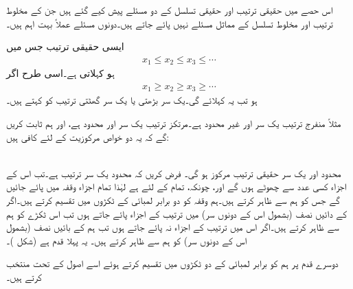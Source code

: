 اس حصے میں حقیقی ترتیب اور حقیقی تسلسل کے دو مسئلے پیش کیے گئے ہیں جن کے مخلوط ترتیب اور مخلوط تسلسل کے مماثل مسئلے نہیں پائے جاتے ہیں۔دونوں مسئلے عملاً بہت اہم ہیں۔

ایسی حقیقی ترتیب   جس میں
\begin{align*}
x_1\le x_2\le x_3\le\cdots
\end{align*} 
ہو  کہلاتی ہے۔اسی طرح  اگر
\begin{align*}
x_1\ge x_2\ge x_3\ge\cdots
\end{align*} 
ہو تب یہ  کہلائے گی۔یک سر بڑھتی یا یک سر گھٹتی ترتیب
 کو   کہتے ہیں۔

مثلاً منفرج ترتیب  یک سر اور غیر محدود ہے۔مرتکز ترتیب  یک سر اور محدود ہے، اور ہم ثابت کریں گے کہ یہ دو خواص مرکوزیت کے لئے کافی ہیں:

\quad {}\\
محدود اور یک سر حقیقی ترتیب مرکوز ہو گی۔
\quad
فرض کریں کہ  محدود یک سر ترتیب ہے۔تب اس کے اجزاء کسی عدد  سے چھوٹے ہوں گے اور، چونکہ، تمام  کے لئے  ہے لہٰذا تمام اجزاء  وقفہ  میں پائے جائیں گے جس کو ہم  سے ظاہر کرتے ہیں۔ہم  وقفہ  کو دو برابر لمبائی کے ٹکڑوں میں تقسیم کرتے ہیں۔اگر  کے دائیں نصف (بشمول اس کے دونوں سر) میں ترتیب کے اجزاء پائے جاتے ہوں تب اس ٹکڑے کو ہم  سے ظاہر کرتے ہیں۔اگر اس میں ترتیب کے اجزاء نہ پائے جاتے ہوں تب ہم  کے بائیں نصف (بشمول اس کے دونوں سر) کو ہم  سے ظاہر کرتے ہیں۔ یہ پہلا قدم ہے
 (شکل )۔

دوسرے قدم پر ہم  کو برابر لمبائی کے دو ٹکڑوں میں تقسیم کرتے ہوئے اسے اصول کے تحت  منتخب کرتے ہیں۔

